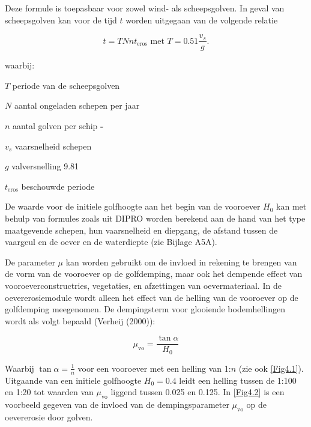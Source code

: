 Deze formule is toepasbaar voor zowel wind- als scheepsgolven.
In geval van scheepsgolven kan voor de tijd $t$ worden uitgegaan van de volgende relatie

\begin{equation}
t = T N n t_\text{eros} \text{ met } T = 0.51 \frac{v_s}{g} \text{.}
\end{equation}

waarbij:

\begin{symbollist}
\item[$T$] periode van de scheepsgolven 
\item[$N$] aantal ongeladen schepen per jaar \unitbrackets{-}
\item[$n$] aantal golven per schip \textbf{-}
\item[$v_s$] vaarsnelheid schepen 
\item[$g$] valversnelling 9.81 
\item[$t_\text{eros}$] beschouwde periode 
\end{symbollist}

De waarde voor de initiele golfhoogte aan het begin van de vooroever $H_0$ kan met behulp van formules zoals uit DIPRO worden berekend aan de hand van het type maatgevende schepen, hun vaarsnelheid en diepgang, de afstand tussen de vaargeul en de oever en de waterdiepte (zie Bijlage A5A).

De parameter $\mu$ kan worden gebruikt om de invloed in rekening te brengen van de vorm van de vooroever op de golfdemping, maar ook het dempende effect van vooroeverconstructries, vegetaties, en afzettingen van oevermateriaal.
In de oevererosiemodule wordt alleen het effect van de helling van de vooroever op de golfdemping meegenomen.
De dempingsterm voor glooiende bodemhellingen wordt als volgt bepaald (Verheij (2000)):

\begin{equation}
\mu_\text{vo} = \frac{\tan \alpha}{H_0}
\end{equation}

Waarbij $\tan \alpha = \frac{1}{n}$ voor een vooroever met een helling van 1:$n$ (zie ook \autoref{Fig4.1}).
Uitgaande van een initiele golfhoogte $H_0 = 0.4$ leidt een helling tussen de 1:100 en 1:20 tot waarden van $\mu_\text{vo}$ liggend tussen 0.025 en 0.125.
In \autoref{Fig4.2} is een voorbeeld gegeven van de invloed van de dempingsparameter $\mu_\text{vo}$ op de oevererosie door golven.

